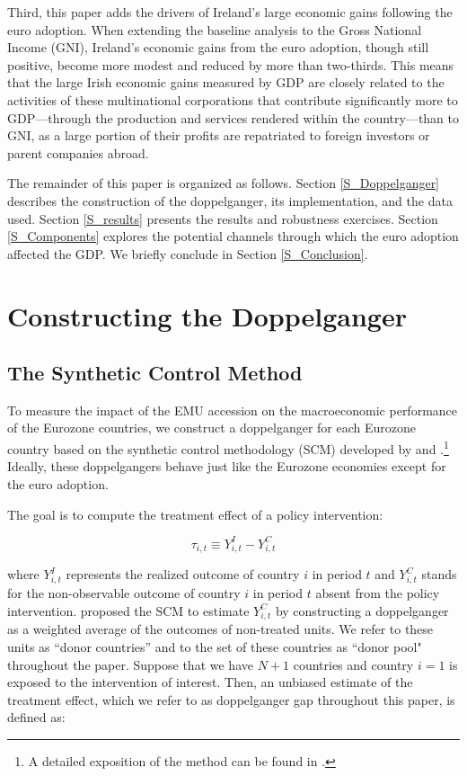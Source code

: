 \documentclass[12pt]{article}
\begin{document}
Third, this paper adds the drivers of Ireland's large economic gains following the euro adoption. When extending the baseline analysis to the Gross National Income (GNI),  Ireland's economic gains from the euro adoption, though still positive, become more modest and reduced by more than two-thirds. This means that the large Irish economic gains measured by GDP are closely related to the activities of these multinational corporations that contribute significantly more to GDP---through the production and services rendered within the country---than to GNI, as a large portion of their profits are repatriated to foreign investors or parent companies abroad. 

The remainder of this paper is organized as follows. Section \ref{S_Doppelganger} describes the construction of the doppelganger, its implementation, and the data used. Section \ref{S_results} presents the results and robustness exercises. Section \ref{S_Components} explores the potential channels through which the euro adoption affected the GDP. We briefly conclude in Section \ref{S_Conclusion}.

\section{Constructing the Doppelganger \label{S_Doppelganger}}

\subsection{The Synthetic Control Method \label{SS_Method}}

To measure the impact of the EMU accession on the macroeconomic performance of the Eurozone countries, we construct a doppelganger for each Eurozone country based on the synthetic control methodology (SCM) developed by \cite{Abadie2003} and \cite{Abadie2010, Abadie2015}.\footnote{A detailed exposition of the method can be found in \cite{Abadie2019}.} Ideally, these doppelgangers behave just like the Eurozone economies except for the euro adoption.

The goal is to compute the treatment effect of a policy intervention:

\begin{equation*}
    \tau_{i,t} \equiv Y_{i,t}^I - Y_{i,t}^C
\end{equation*}

where $Y_{i,t}^I$ represents the realized outcome of country $i$ in period $t$ and $Y_{i,t}^C$ stands for the non-observable outcome of country $i$ in period $t$ absent from the policy intervention. \cite{Abadie2003} proposed the SCM to estimate $Y_{i,t}^C$ by constructing a doppelganger as a weighted average of the outcomes of non-treated units. We refer to these units as ``donor countries'' and to the set of these countries as ``donor pool" throughout the paper. Suppose that we have $N + 1$ countries and country $i = 1$ is exposed to the intervention of interest. Then, an unbiased estimate of the treatment effect, which we refer to as doppelganger gap throughout this paper, is defined as:
\end{document}
